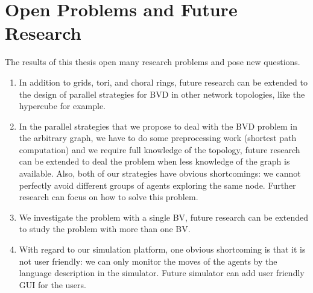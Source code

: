 \section{Open Problems and Future Research}
The results of this thesis open many research problems and pose new questions.
\begin{enumerate}
\item In addition to grids, tori, and choral rings, future research can be extended to the design of parallel strategies for BVD  in other   network topologies, like the hypercube for example.
\item In the parallel strategies that we propose to deal with the BVD problem in the arbitrary graph, we have to do some preprocessing work (shortest path computation)  and we require full knowledge of the topology,  future research can be extended to deal the problem when less knowledge of the graph is available. Also, both of our strategies have obvious shortcomings: we cannot perfectly avoid different groups of agents exploring the same node. Further research can focus on how to solve this problem. 
\item We   investigate the problem with   a single  BV,   future research can be extended to study the problem with more than one BV.
\item With regard to our simulation platform, one obvious shortcoming is that it is not user friendly: we can only monitor the moves of the agents by the language description in the simulator. Future simulator can add user friendly GUI for the users.
\end{enumerate}


















